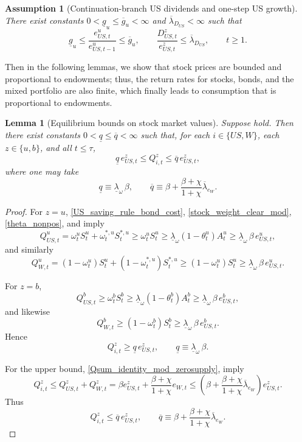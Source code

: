 \documentclass[12pt]{article}
\theoremstyle{plain}
\newtheorem{ass}{Assumption}
\newtheorem{lem}{Lemma}
\begin{document}
\begin{ass}[Continuation-branch US dividends and one-step US growth]\label{ass_u_dividend_growth}
There exist constants $0<\underline g_u\le \overline g_u<\infty$ and
$\overline\lambda_{D_{US}}<\infty$ such that
\[
\underline g_u
\le
\frac{e_{US,t}^u}{e_{US,t-1}^u}
\le
\overline g_u,
\qquad
\frac{D_{US,t}^z}{e_{US,t}^z}
\le
\overline\lambda_{D_{US}},
\qquad t\ge 1.
\]
\end{ass}

Then in the following lemmas, we show that stock prices are bounded and proportional to endowments; thus, the return rates for stocks, bonds, and the mixed portfolio are also finite, which finally leads to consumption that is proportional to endowments.

\begin{lem}[Equilibrium bounds on stock market values]\label{lem_stock_value_bounds}
Suppose
hold. Then there exist constants $0<\underline q\le \overline q<\infty$ such that, for each
$i\in\{US,W\}$, each $z\in\{u,b\}$, and all $t\le\tau$,
\[
\underline q\,e_{US,t}^z
\le
Q_{i,t}^z
\le
\overline q\,e_{US,t}^z,
\]
where one may take
\[
\underline q\equiv \underline\lambda_\omega\,\beta,
\qquad
\overline q\equiv
\beta
+\frac{\beta+\chi}{1+\chi}\overline\lambda_{e_W}.
\]
\end{lem}

\begin{proof}
For $z=u$, \eqref{US_saving_rule_bond_cost}, \eqref{stock_weight_clear_mod},  \eqref{theta_nonpos}, and
 imply
\[
Q_{US,t}^u
=
\omega_t^u S_t^u+\omega_t^{*,u}S_t^{*,u}
\ge
\omega_t^u S_t^u
\ge
\underline\lambda_\omega(1-\theta_t^u)A_t^u
\ge
\underline\lambda_\omega\,\beta\,e_{US,t}^u,
\]
and similarly
\[
Q_{W,t}^u
=
(1-\omega_t^u)S_t^u+(1-\omega_t^{*,u})S_t^{*,u}
\ge
(1-\omega_t^u)S_t^u
\ge
\underline\lambda_\omega\,\beta\,e_{US,t}^u.
\]

For $z=b$, 
\[
Q_{US,t}^b
\ge
\omega_t^b S_t^b
\ge
\underline\lambda_\omega(1-\theta_t^b)A_t^b
\ge
\underline\lambda_\omega\,\beta\,e_{US,t}^b,
\]
and likewise
\[
Q_{W,t}^b
\ge
(1-\omega_t^b)S_t^b
\ge
\underline\lambda_\omega\,\beta \,e_{US,t}^b.
\]
Hence
\[
Q_{i,t}^z\ge \underline q\,e_{US,t}^z,
\qquad
\underline q\equiv \underline\lambda_\omega\,\beta.
\]

For the upper bound, \eqref{Qsum_identity_mod_zerosupply},
 imply
\[
Q_{i,t}^z
\le
Q_{US,t}^z+Q_{W,t}^z
=
\beta e_{US,t}^z+\frac{\beta+\chi}{1+\chi}e_{W,t}
\le
\left(
\beta
+\frac{\beta+\chi}{1+\chi}\overline\lambda_{e_W}
\right)e_{US,t}^z.
\]
Thus
\[
Q_{i,t}^z\le \overline q\,e_{US,t}^z,
\qquad
\overline q\equiv
\beta
+\frac{\beta+\chi}{1+\chi}\overline\lambda_{e_W}.
\]
\end{proof}
\end{document}
